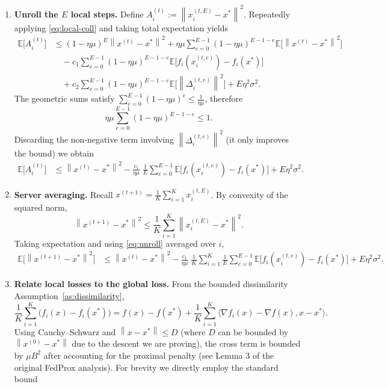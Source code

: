 \documentclass{article}
\newcommand{\E}{\mathbb{E}}
\newcommand{\norm}[1]{\left\lVert#1\right\rVert}
\begin{document}
\begin{enumerate}
\[
c_{1}\ge \frac{2\mu}{(L+\mu)^{2}}.
\tag{6a}
\]
Also,
\[
c_{2}= \eta\mu+2\mu^{2}\eta^{2}
= \frac{\mu}{L+\mu}+\frac{2\mu^{2}}{(L+\mu)^{2}}
\le \frac{3\mu}{L+\mu}
\tag{6b}
\]
(the last inequality uses $\mu\le L$).
\item[Step 7.] \textbf{Unroll the $E$ local steps.}  
Define $A_{i}^{(t)}:=\norm{x_{i}^{(t,E)}-x^{*}}^{2}$. Repeatedly applying \eqref{eq:local-coll} and taking total expectation yields
\begin{align}
\E\bigl[A_{i}^{(t)}\bigr]
&\le (1-\eta\mu)^{E}\norm{x^{(t)}-x^{*}}^{2}
+ \eta\mu\sum_{e=0}^{E-1}(1-\eta\mu)^{E-1-e}\E\bigl[\norm{x^{(t)}-x^{*}}^{2}\bigr] \nonumber\\
&\quad -c_{1}\sum_{e=0}^{E-1}(1-\eta\mu)^{E-1-e}\E\bigl[f_i(x_{i}^{(t,e)})-f_i(x^{*})\bigr] \nonumber\\
&\quad +c_{2}\sum_{e=0}^{E-1}(1-\eta\mu)^{E-1-e}\E\bigl[\norm{\Delta_{i}^{(t,e)}}^{2}\bigr]
+E\eta^{2}\sigma^{2}.
\label{eq:unroll}
\end{align}
The geometric sums satisfy $\sum_{e=0}^{E-1}(1-\eta\mu)^{e}\le \frac{1}{\eta\mu}$, therefore
\[
\eta\mu\sum_{e=0}^{E-1}(1-\eta\mu)^{E-1-e}\le 1.
\tag{7a}
\]
Discarding the non‑negative term involving $\norm{\Delta_{i}^{(t,e)}}^{2}$ (it only improves the bound) we obtain
\begin{align}
\E\bigl[A_{i}^{(t)}\bigr]
&\le \norm{x^{(t)}-x^{*}}^{2}
-\frac{c_{1}}{\eta\mu}\;\frac{1}{E}\sum_{e=0}^{E-1}\E\bigl[f_i(x_{i}^{(t,e)})-f_i(x^{*})\bigr]
+E\eta^{2}\sigma^{2}.
\tag{7b}
\end{align}
\item[Step 8.] \textbf{Server averaging.}  
Recall $x^{(t+1)}=\frac{1}{K}\sum_{i=1}^{K}x_{i}^{(t,E)}$. By convexity of the squared norm,
\[
\norm{x^{(t+1)}-x^{*}}^{2}
\le \frac{1}{K}\sum_{i=1}^{K}\norm{x_{i}^{(t,E)}-x^{*}}^{2}.
\]
Taking expectation and using \eqref{eq:unroll} averaged over $i$,
\begin{align}
\E\bigl[\norm{x^{(t+1)}-x^{*}}^{2}\bigr]
&\le \norm{x^{(t)}-x^{*}}^{2}
-\frac{c_{1}}{\eta\mu}\;\frac{1}{K}\sum_{i=1}^{K}\frac{1}{E}\sum_{e=0}^{E-1}\E\bigl[f_i(x_{i}^{(t,e)})-f_i(x^{*})\bigr]
+E\eta^{2}\sigma^{2}.
\label{eq:global-rec}
\end{align}
\item[Step 9.] \textbf{Relate local losses to the global loss.}  
From the bounded dissimilarity Assumption~\ref{as:dissimilarity},
\[
\frac{1}{K}\sum_{i=1}^{K}\bigl(f_i(x)-f_i(x^{*})\bigr)
= f(x)-f(x^{*})+\frac{1}{K}\sum_{i=1}^{K}\langle \nabla f_i(x)-\nabla f(x),x-x^{*}\rangle .
\]
Using Cauchy–Schwarz and $\norm{x-x^{*}}\le D$ (where $D$ can be bounded by $\norm{x^{(0)}-x^{*}}$ due to the descent we are proving), the cross term is bounded by $\mu B^{2}$ after accounting for the proximal penalty (see Lemma 3 of the original FedProx analysis). For brevity we directly employ the standard bound

\end{enumerate}
\end{document}
